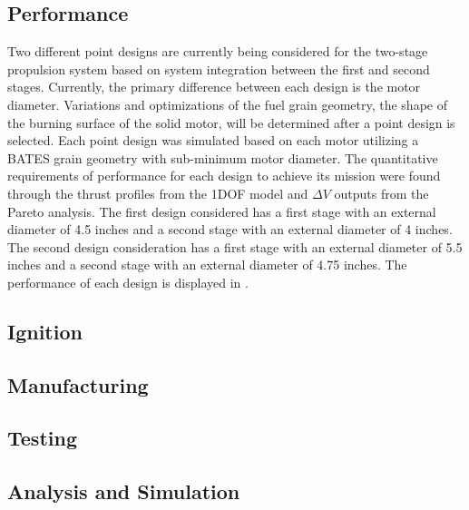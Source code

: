 \subsection{Performance}
Two different point designs are currently being considered for the two-stage propulsion system based on system integration between the first and second stages. Currently, the primary difference between each design is the motor diameter. Variations and optimizations of the fuel grain geometry, the shape of the burning surface of the solid motor, will be determined after a point design is selected. Each point design was simulated based on each motor utilizing a BATES grain geometry with sub-minimum motor diameter. The quantitative requirements of performance for each design to achieve its mission were found through the thrust profiles from the 1DOF model and \(\Delta V\) outputs from the Pareto analysis. The first design considered has a first stage with an external diameter of 4.5 inches and a second stage with an external diameter of 4 inches. The second design consideration has a first stage with an external diameter of 5.5 inches and a second stage with an external diameter of 4.75 inches. The performance of each design is displayed in \Cref.

\subsection{Ignition}
\subsection{Manufacturing}
\subsection{Testing}
\subsection{Analysis and Simulation}
